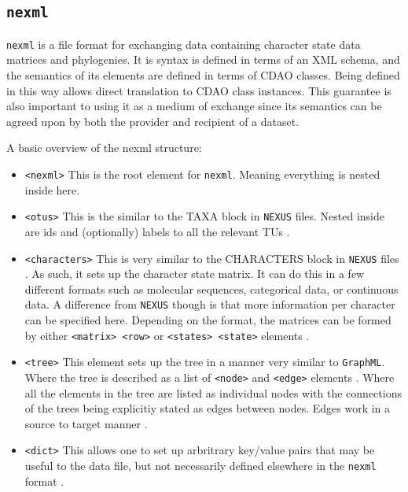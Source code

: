 \documentclass[10pt]{bmc_article}
\newenvironment{bmcformat}{\fussy\setboolean{publ}{true}}{\fussy}
\begin{document}
\begin{bmcformat}
\subsection*{\tt nexml}
  {\tt nexml} \cite{nexml} is a file format for exchanging data containing character state data
  matrices and phylogenies. It is syntax is defined in terms of an XML schema, and the semantics of its elements
  are defined in terms of CDAO classes. Being defined in this way allows direct translation to CDAO class instances.
  This guarantee is also important to using it as a medium of exchange since its semantics can be agreed upon by
  both the provider and recipient of a dataset.
  
  A basic overview of the nexml structure:
  \begin{itemize}
    \item {\tt <nexml>}  This is the root element for {\tt nexml}\cite{nexmlFormat}.  Meaning everything is nested inside here.
    \item {\tt <otus>} This is the similar to the TAXA block in {\tt NEXUS} files.  Nested inside are ids and (optionally) labels to all the relevant TUs \cite{nexmlFormat}.
   \item {\tt <characters>} This is very similar to the CHARACTERS block in {\tt NEXUS} files \cite{nexmlFormat}.  As such, it sets up the character state matrix.  It can do this in a few different formats such as molecular sequences, categorical data, or continuous data.  A difference from {\tt NEXUS} though is that more information per character can be specified here.  Depending on the format, the matrices can be formed by either {\tt <matrix> <row>} or {\tt <states> <state>} elements \cite{nexmlFormat}.
   \item {\tt <tree>} This element sets up the tree in a manner very similar to {\tt GraphML}\cite{graphml}.  Where the tree is described as a list of {\tt <node>} and {\tt <edge>} elements \cite{nexmlFormat}.  Where all the elements in the tree are listed as individual nodes with the connections of the trees being explicitiy stated as edges between nodes.  Edges work in a source to target manner \cite{nexmlFormat}.
   \item {\tt <dict>} This allows one to set up arbritrary key/value pairs that may be useful to the data file, but not necessarily defined elsewhere in the {\tt nexml} format \cite{nexmlFormat}.
   \end{itemize}



\end{bmcformat}
\end{document}
